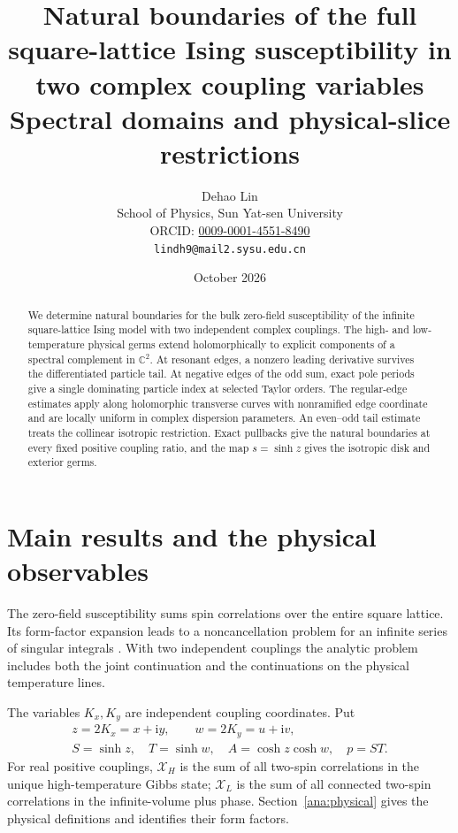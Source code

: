 \documentclass[11pt]{article}
\title{Natural boundaries of the full square-lattice Ising\newline
susceptibility in two complex coupling variables\newline
\large Spectral domains and physical-slice restrictions}
\author{Dehao Lin\\School of Physics, Sun Yat-sen University\\\small ORCID: \href{https://orcid.org/0009-0001-4551-8490}{0009-0001-4551-8490}\\\small\texttt{lindh9@mail2.sysu.edu.cn}}
\date{October 2026}
\numberwithin{equation}{section}
\theoremstyle{definition}
\newcommand{\C}{\mathbb C}
\newcommand{\ii}{\mathrm i}
\begin{document}
\maketitle
\begin{abstract}
We determine natural boundaries for the bulk zero-field susceptibility
of the infinite square-lattice Ising model with two independent complex
couplings. The high- and low-temperature physical germs extend
holomorphically to explicit components of a spectral complement in
\(\C^2\). At resonant edges, a nonzero leading derivative survives the
differentiated particle tail. At negative edges of the odd sum, exact
pole periods give a single dominating particle index at selected
Taylor orders. The regular-edge estimates apply along holomorphic
transverse curves with nonramified edge coordinate and are locally
uniform in complex dispersion parameters. An even--odd tail estimate
treats the collinear isotropic restriction. Exact pullbacks give the
natural boundaries at every fixed positive coupling ratio, and the
map \(s=\sinh z\) gives the isotropic disk and exterior germs.
\end{abstract}

\section{Main results and the physical observables}
\label{main:statement}

The zero-field susceptibility sums spin correlations over the entire
square lattice. Its form-factor expansion leads to a noncancellation
problem for an infinite series of singular integrals
\cite[Section 3.2]{ONGP}\cite[Section 6]{BHM}. With two independent
couplings the analytic problem includes both the joint continuation
and the continuations on the physical temperature lines.

The variables \(K_x,K_y\) are independent coupling coordinates.
Put
\[
 \begin{gathered}
 z=2K_x=x+\ii y,\qquad w=2K_y=u+\ii v,\\
 S=\sinh z,\quad T=\sinh w,\quad A=\cosh z\cosh w,\quad p=ST.
 \end{gathered}
\]
For real positive couplings, \(\mathcal X_H\) is the sum of all
two-spin correlations in the unique high-temperature Gibbs state;
\(\mathcal X_L\) is the sum of all connected two-spin correlations
in the infinite-volume plus phase. Section~\ref{ana:physical}
gives the physical definitions and identifies their form factors.
\end{document}
